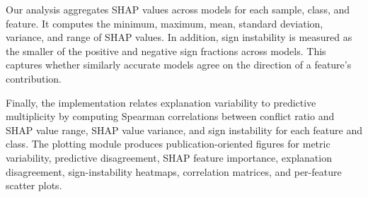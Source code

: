 Our analysis aggregates \gls{SHAP} values across models for each sample, class, and feature. It computes the minimum, maximum, mean, standard deviation, variance, and range of \gls{SHAP} values. In addition, sign instability is measured as the smaller of the positive and negative sign fractions across models. This captures whether similarly accurate models agree on the direction of a feature's contribution.

Finally, the implementation relates explanation variability to predictive multiplicity by computing Spearman correlations between conflict ratio and \gls{SHAP} value range, \gls{SHAP} value variance, and sign instability for each feature and class. The plotting module produces publication-oriented figures for metric variability, predictive disagreement, \gls{SHAP} feature importance, explanation disagreement, sign-instability heatmaps, correlation matrices, and per-feature scatter plots.
